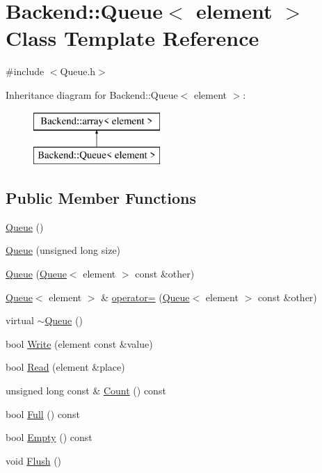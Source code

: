\hypertarget{class_backend_1_1_queue}{\section{Backend\+:\+:Queue$<$ element $>$ Class Template Reference}
\label{class_backend_1_1_queue}
}


{\ttfamily \#include $<$Queue.\+h$>$}

Inheritance diagram for Backend\+:\+:Queue$<$ element $>$\+:\begin{figure}[H]
\begin{center}
\leavevmode
\includegraphics[height=2.000000cm]{class_backend_1_1_queue}
\end{center}
\end{figure}
\subsection*{Public Member Functions}
\begin{DoxyCompactItemize}
\item 
\hyperlink{class_backend_1_1_queue_ac32a0171ecb144e4da8585575160c30c}{Queue} ()
\item 
\hyperlink{class_backend_1_1_queue_ac136488c632785b750fd9fedb5a0986f}{Queue} (unsigned long size)
\item 
\hyperlink{class_backend_1_1_queue_ae7c5f30894c29d332991a15b89aaedba}{Queue} (\hyperlink{class_backend_1_1_queue}{Queue}$<$ element $>$ const \&other)
\item 
\hyperlink{class_backend_1_1_queue}{Queue}$<$ element $>$ \& \hyperlink{class_backend_1_1_queue_a37a138f7a66cbafaab64e10dd9f740e9}{operator=} (\hyperlink{class_backend_1_1_queue}{Queue}$<$ element $>$ const \&other)
\item 
virtual \hyperlink{class_backend_1_1_queue_a9c323720d0c6d433be2a6f5b479e9d47}{$\sim$\+Queue} ()
\item 
bool \hyperlink{class_backend_1_1_queue_aed4ea61ff04a1b2faad6c3f967372bd5}{Write} (element const \&value)
\item 
bool \hyperlink{class_backend_1_1_queue_a10d3583a888cebe4d53863f83249cc13}{Read} (element \&place)
\item 
unsigned long const \& \hyperlink{class_backend_1_1_queue_abb378e040ec42c42b78b10bcb60a933b}{Count} () const 
\item 
bool \hyperlink{class_backend_1_1_queue_acb0a8bd00d4708253e5d25465191dca1}{Full} () const 
\item 
bool \hyperlink{class_backend_1_1_queue_af9f6bfd2928b6a8e0557042da977b9d5}{Empty} () const 
\item 
void \hyperlink{class_backend_1_1_queue_a701ab0dc2289929467d9e1cc5771f80c}{Flush} ()
\end{DoxyCompactItemize}
